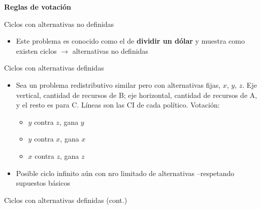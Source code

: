 \documentclass[
  ignorenonframetext,
]{beamer}
\providecommand{\tightlist}{%
  \setlength{\itemsep}{0pt}\setlength{\parskip}{0pt}}\usepackage{longtable,booktabs,array}
\begin{document}
\begin{frame}{\textbf{Reglas de votación}}
\begin{block}{Ciclos con alternativas no definidas}
\begin{itemize}
  \begin{itemize}
  \tightlist
  \item
    Inicial \(\longrightarrow\) \((333.3,333.3,333.3)\)
  \item
    Propuesta de 1 \(\longrightarrow\) \((600,400,0)\) {[}gana por
    mayoría{]}
  \item
    Propuesta de 3 \(\longrightarrow\) \((0,600,400)\) {[}gana por
    mayoría{]}
  \item
    Propuesta de 1 \(\longrightarrow\) \((300,700,0)\) {[}gana por
    mayoría{]}
  \item
    Propuesta de 3 \(\longrightarrow\) \((333.3,333.3,333.3)\) y
    así\ldots{}
  \end{itemize}
\item
  Este problema es conocido como el de \textbf{dividir un dólar} y
  muestra como existen ciclos \(\longrightarrow\) alternativas no
  definidas
\end{itemize}
\end{block}

\begin{block}{Ciclos con alternativas definidas}
\protect\hypertarget{ciclos-con-alternativas-definidas}{}
\begin{itemize}
\tightlist
\item
  Sea un problema redistributivo similar pero con alternativas fijas,
  \(x\), \(y\), \(z\). Eje vertical, cantidad de recursos de B; eje
  horizontal, cantidad de recursos de A, y el resto es para C. Líneas
  son las CI de cada político. Votación:

  \begin{itemize}
  \tightlist
  \item
    \(y\) contra \(z\), gana \(y\)
  \item
    \(y\) contra \(x\), gana \(x\)
  \item
    \(x\) contra \(z\), gana \(z\)
  \end{itemize}
\item
  Posible ciclo infinito aún con nro limitado de alternativas
  --respetando supuestos básicos
\end{itemize}
\end{block}

\begin{block}{Ciclos con alternativas definidas (cont.)}
\protect\hypertarget{ciclos-con-alternativas-definidas-cont.}{}
\begin{figure}


\end{figure}
\end{block}
\end{frame}
\end{document}
